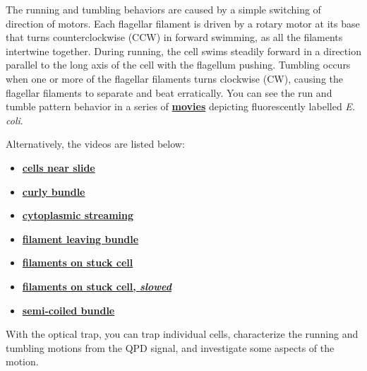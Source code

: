 \documentclass{../lab}
\begin{document}
\newpage

The running and tumbling behaviors are caused by a simple switching of direction of motors. Each flagellar filament is driven by a rotary motor at its base that turns counterclockwise (CCW) in forward swimming, as all the filaments intertwine together. During running, the cell swims steadily forward in a direction parallel to the long axis of the cell with the flagellum pushing. Tumbling occurs when one or more of the flagellar filaments turns clockwise (CW), causing the flagellar filaments to separate and beat erratically. You can see the run and tumble pattern behavior in a series of \href{http://www.rowland.harvard.edu/labs/bacteria/movies/ecoli.php}{\textbf{movies}} depicting fluorescently labelled \emph{E. coli}.

Alternatively, the videos are listed below:

\begin{itemize}
        \item \href{http://physics111.lib.berkeley.edu/Physics111/Reprints/OTZ/cellsnearslide.avi}{\textbf{cells near slide}}

        \item \href{http://physics111.lib.berkeley.edu/Physics111/Reprints/OTZ/curlybundle.avi}{\textbf{curly bundle}}

        \item \href{http://physics111.lib.berkeley.edu/Physics111/Reprints/OTZ/cytoplasmicstreaming.avi}{\textbf{cytoplasmic streaming}}

        \item \href{http://physics111.lib.berkeley.edu/Physics111/Reprints/OTZ/filamentleavingbundle.avi}{\textbf{filament leaving bundle}}
        
        \item \href{http://physics111.lib.berkeley.edu/Physics111/Reprints/OTZ/filamentsonstuckcell.avi}{\textbf{filaments on stuck cell}}

        \item \href{http://physics111.lib.berkeley.edu/Physics111/Reprints/OTZ/fluorescentbundlesslow.avi}{\textbf{filaments on stuck cell, \emph{slowed}}}

        \item \href{http://physics111.lib.berkeley.edu/Physics111/Reprints/OTZ/semicoiledbundle.avi}{\textbf{semi-coiled bundle}}

\end{itemize}

With the optical trap, you can trap individual cells, characterize the running and tumbling motions from the QPD signal, and investigate some aspects of the motion.
\end{document}
